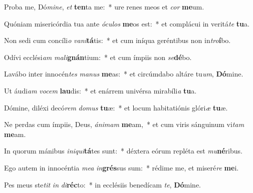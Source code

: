 \item Proba me, Dó\textit{mi}\textit{ne}, \textit{et} \textbf{ten}ta me:~* ure renes meos et \textit{cor} \textbf{me}um.
\item Quóniam misericórdia tua ante \textit{ó}\textit{cu}\textit{los} \textbf{me}os est:~* et complácui in veritá\textit{te} \textbf{tu}a.
\item Non sedi cum concíli\textit{o} \textit{va}\textit{ni}\textbf{tá}tis:~* et cum iníqua geréntibus non in\textit{tro}\textbf{í}bo.
\item Odívi ecclési\textit{am} \textit{ma}\textit{li}\textbf{gnán}tium:~* et cum ímpiis non \textit{se}\textbf{dé}bo.
\item Lavábo inter innocén\textit{tes} \textit{ma}\textit{nus} \textbf{me}as:~* et circúmdabo altáre tu\textit{um}, \textbf{Dó}mine.
\item Ut áudi\textit{am} \textit{vo}\textit{cem} \textbf{lau}dis:~* et enárrem univérsa mirabíli\textit{a} \textbf{tu}a.
\item Dómine, diléxi decó\textit{rem} \textit{do}\textit{mus} \textbf{tu}æ:~* et locum habitatiónis glóri\textit{æ} \textbf{tu}æ.
\item Ne perdas cum ímpiis, Deus, \textit{á}\textit{ni}\textit{mam} \textbf{me}am,~* et cum viris sánguinum vi\textit{tam} \textbf{me}am.
\item In quorum mánibus \textit{in}\textit{i}\textit{qui}\textbf{tá}tes sunt:~* déxtera eórum repléta est \textit{mu}\textbf{né}ribus.
\item Ego autem in innocéntia \textit{me}\textit{a} \textit{in}\textbf{grés}sus sum:~* rédime me, et miseré\textit{re} \textbf{me}i.
\item Pes meus ste\textit{tit} \textit{in} \textit{di}\textbf{réc}to:~* in ecclésiis benedícam \textit{te}, \textbf{Dó}mine.
